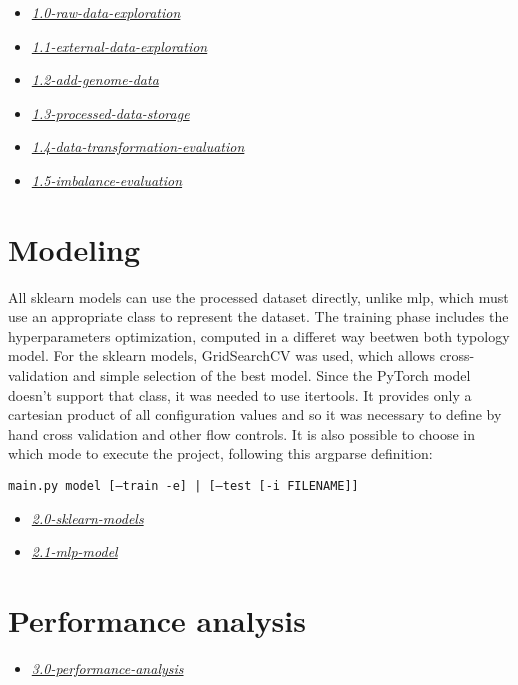 \documentclass[../main]{subfiles}
\begin{document}
\begin{itemize}
    \item \href{https://github.com/prushh/movie-lens-mlp/blob/main/notebooks/1.0-raw-data-exploration.ipynb}{\textit{1.0-raw-data-exploration}}
    \item \href{https://github.com/prushh/movie-lens-mlp/blob/main/notebooks/1.1-external-data-exploration.ipynb}{\textit{1.1-external-data-exploration}}
    \item \href{https://github.com/prushh/movie-lens-mlp/blob/main/notebooks/1.2-add-genome-data.ipynb}{\textit{1.2-add-genome-data}}
    \item \href{https://github.com/prushh/movie-lens-mlp/blob/main/notebooks/1.3-processed-data-storage.ipynb}{\textit{1.3-processed-data-storage}}
    \item \href{https://github.com/prushh/movie-lens-mlp/blob/main/notebooks/1.4-data-transformation-evaluation.ipynb}{\textit{1.4-data-transformation-evaluation}}
    \item \href{https://github.com/prushh/movie-lens-mlp/blob/main/notebooks/1.5-imbalance-evaluation.ipynb}{\textit{1.5-imbalance-evaluation}}
\end{itemize}

\section{Modeling}
All sklearn models can use the processed dataset directly, unlike mlp, which must use an appropriate class to represent the dataset.
The training phase includes the hyperparameters optimization, computed in a differet way beetwen both typology model.
For the sklearn models, GridSearchCV was used, which allows cross-validation and simple selection of the best model.
Since the PyTorch model doesn't support that class, it was needed to use itertools.
It provides only a cartesian product of all configuration values and so it was necessary to define by hand cross validation and other flow controls.
It is also possible to choose in which mode to execute the project, following this argparse definition:
\begin{center}
    \texttt{main.py model [--train -e] | [--test [-i FILENAME]]}
\end{center}

\begin{itemize}
    \item \href{https://github.com/prushh/movie-lens-mlp/blob/main/notebooks/2.0-sklearn-models.ipynb}{\textit{2.0-sklearn-models}}
    \item \href{https://github.com/prushh/movie-lens-mlp/blob/main/notebooks/2.1-mlp-model.ipynb}{\textit{2.1-mlp-model}}
\end{itemize}

\section{Performance analysis}
\begin{itemize}
    \item \href{https://github.com/prushh/movie-lens-mlp/blob/main/notebooks/3.0-performance-analysis.ipynb}{\textit{3.0-performance-analysis}}
\end{itemize}
\end{document}
